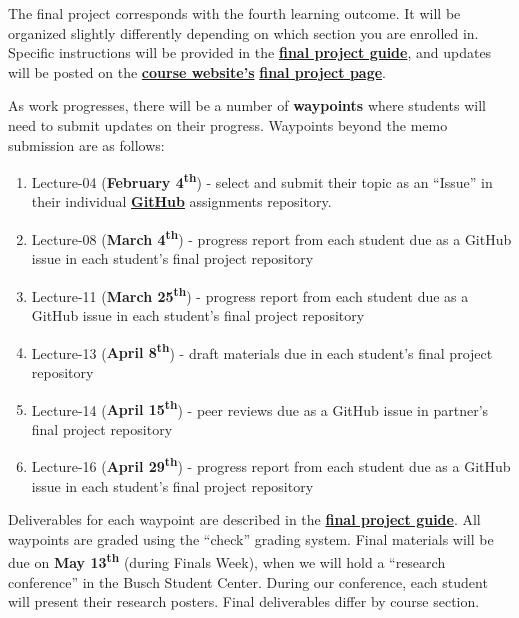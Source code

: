 \documentclass[]{book}
\providecommand{\tightlist}{%
  \setlength{\itemsep}{0pt}\setlength{\parskip}{0pt}}
\begin{document}
The final project corresponds with the fourth learning outcome. It will be organized slightly differently depending on which section you are enrolled in. Specific instructions will be provided in the \href{https://slu-soc5650.github.io/finalGuide}{\textbf{final project guide}}, and updates will be posted on the \href{https://slu-soc5650.github.io/}{\textbf{course website's}} \href{https://slu-soc5650.github.io/final-project}{\textbf{final project page}}.

As work progresses, there will be a number of \textbf{waypoints} where students will need to submit updates on their progress. Waypoints beyond the memo submission are as follows:

\begin{enumerate}
\def\labelenumi{\arabic{enumi}.}
\tightlist
\item
  Lecture-04 (\textbf{February 4\textsuperscript{th}}) - select and submit their topic as an ``Issue'' in their individual \href{https://github.com/slu-soc5650}{\textbf{GitHub}} assignments repository.
\item
  Lecture-08 (\textbf{March 4\textsuperscript{th}}) - progress report from each student due as a GitHub issue in each student's final project repository
\item
  Lecture-11 (\textbf{March 25\textsuperscript{th}}) - progress report from each student due as a GitHub issue in each student's final project repository
\item
  Lecture-13 (\textbf{April 8\textsuperscript{th}}) - draft materials due in each student's final project repository
\item
  Lecture-14 (\textbf{April 15\textsuperscript{th}}) - peer reviews due as a GitHub issue in partner's final project repository
\item
  Lecture-16 (\textbf{April 29\textsuperscript{th}}) - progress report from each student due as a GitHub issue in each student's final project repository
\end{enumerate}

Deliverables for each waypoint are described in the \href{https://slu-soc5650.github.io/finalGuide}{\textbf{final project guide}}. All waypoints are graded using the ``check'' grading system. Final materials will be due on \textbf{May 13\textsuperscript{th}} (during Finals Week), when we will hold a ``research conference'' in the Busch Student Center. During our conference, each student will present their research posters. Final deliverables differ by course section.
\end{document}
